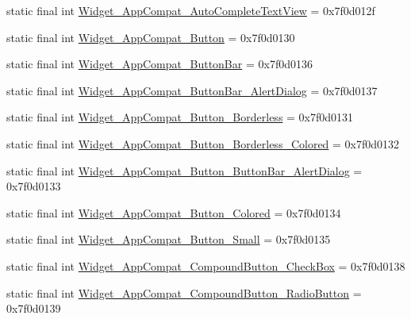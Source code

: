 \begin{DoxyCompactItemize}
\item 
static final int \mbox{\hyperlink{classcom_1_1synnapps_1_1carouselview_1_1_r_1_1style_aca3526f405181942e98b7bc9860e5789}{Widget\+\_\+\+App\+Compat\+\_\+\+Auto\+Complete\+Text\+View}} = 0x7f0d012f
\item 
static final int \mbox{\hyperlink{classcom_1_1synnapps_1_1carouselview_1_1_r_1_1style_ae20cc8271dabe4fcbfd2a098f06bd125}{Widget\+\_\+\+App\+Compat\+\_\+\+Button}} = 0x7f0d0130
\item 
static final int \mbox{\hyperlink{classcom_1_1synnapps_1_1carouselview_1_1_r_1_1style_af4337619150be8a0d2f118be52034c24}{Widget\+\_\+\+App\+Compat\+\_\+\+Button\+Bar}} = 0x7f0d0136
\item 
static final int \mbox{\hyperlink{classcom_1_1synnapps_1_1carouselview_1_1_r_1_1style_a3dfb45821fd6593ffd43e1a6e938609c}{Widget\+\_\+\+App\+Compat\+\_\+\+Button\+Bar\+\_\+\+Alert\+Dialog}} = 0x7f0d0137
\item 
static final int \mbox{\hyperlink{classcom_1_1synnapps_1_1carouselview_1_1_r_1_1style_a5d82139523d02f2531ec65e1c98f364f}{Widget\+\_\+\+App\+Compat\+\_\+\+Button\+\_\+\+Borderless}} = 0x7f0d0131
\item 
static final int \mbox{\hyperlink{classcom_1_1synnapps_1_1carouselview_1_1_r_1_1style_a7f2055f88aa9d9fb32d852651be789af}{Widget\+\_\+\+App\+Compat\+\_\+\+Button\+\_\+\+Borderless\+\_\+\+Colored}} = 0x7f0d0132
\item 
static final int \mbox{\hyperlink{classcom_1_1synnapps_1_1carouselview_1_1_r_1_1style_ac23fd734b53b9dbd63bba09200bbf793}{Widget\+\_\+\+App\+Compat\+\_\+\+Button\+\_\+\+Button\+Bar\+\_\+\+Alert\+Dialog}} = 0x7f0d0133
\item 
static final int \mbox{\hyperlink{classcom_1_1synnapps_1_1carouselview_1_1_r_1_1style_af88342c935b441da0e28eb1325611600}{Widget\+\_\+\+App\+Compat\+\_\+\+Button\+\_\+\+Colored}} = 0x7f0d0134
\item 
static final int \mbox{\hyperlink{classcom_1_1synnapps_1_1carouselview_1_1_r_1_1style_a88dc451915ecdbed7ec95293d148cc36}{Widget\+\_\+\+App\+Compat\+\_\+\+Button\+\_\+\+Small}} = 0x7f0d0135
\item 
static final int \mbox{\hyperlink{classcom_1_1synnapps_1_1carouselview_1_1_r_1_1style_ac200f8d0e4c8e3600311c5de1ef4202f}{Widget\+\_\+\+App\+Compat\+\_\+\+Compound\+Button\+\_\+\+Check\+Box}} = 0x7f0d0138
\item 
static final int \mbox{\hyperlink{classcom_1_1synnapps_1_1carouselview_1_1_r_1_1style_a2572e2eae6e75f2a6c74eb2ba1cb111a}{Widget\+\_\+\+App\+Compat\+\_\+\+Compound\+Button\+\_\+\+Radio\+Button}} = 0x7f0d0139

\end{DoxyCompactItemize}
